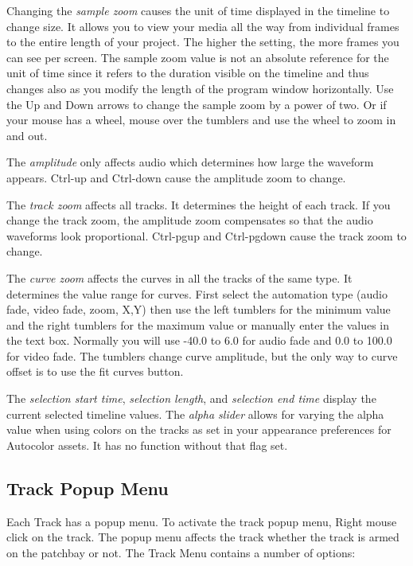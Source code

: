 Changing the \emph{sample zoom} causes the unit of time displayed in the timeline to change size. 
It allows you to view your media all the way from individual frames to the entire length of your project. 
The higher the setting, the more frames you can see per screen. 
The sample zoom value is not an absolute reference for the unit of time since it refers to the duration visible on the timeline and thus changes also as you modify the length of the program window horizontally.
Use the Up and Down arrows to change the sample zoom by a power of two. 
Or if your mouse has a wheel, mouse over the tumblers and use the wheel to zoom in and out.


The \emph{amplitude} only affects audio which determines how large the waveform appears. Ctrl-up and Ctrl-down cause the amplitude zoom to change.

The \emph{track zoom} affects all tracks. 
It determines the height of each track. 
If you change the track zoom, the amplitude zoom compensates so that the audio waveforms look proportional. 
Ctrl-pgup and Ctrl-pgdown cause the track zoom to change.

The \emph{curve zoom} affects the curves in all the tracks of the same type. 
It determines the value range for curves. 
First select the automation type (audio fade, video fade, zoom, X,Y) then use the left tumblers for the minimum value and the right tumblers for the maximum value or manually enter the values in the text box. 
Normally you will use -40.0 to 6.0 for audio fade and 0.0 to 100.0 for video fade. 
The tumblers change curve amplitude, but the only way to curve offset is to use the fit curves button.

The \emph{selection start time}, \emph{selection length}, and \emph{selection end time} display the current selected timeline values.  
The \emph{alpha slider} allows for varying the alpha value when using colors on the tracks as set in your appearance preferences for Autocolor assets.  
It has no function without that flag set.

\subsection{Track Popup Menu}%
\label{sub:track_popup_menu}

Each Track has a popup menu. 
To activate the track popup menu, Right mouse click on the track. 
The popup menu affects the track whether the track is armed on the patchbay or not. 
The Track Menu contains a number of options:

